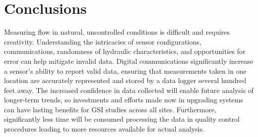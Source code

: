 \section{Conclusions}

Measuring flow in natural, uncontrolled conditions is difficult and requires creativity.
Understanding the intricacies of sensor configurations, communications, randomness of hydraulic characteristics, and opportunities for error can help mitigate invalid data.
Digital communications significantly increase a sensor's ability to report valid data, ensuring that measurements taken in one location are accurately represented and stored by a data logger several hundred feet away.
The increased confidence in data collected will enable future analysis of longer-term trends, so investments and efforts made now in upgrading systems can have lasting benefits for GSI studies across all sites.
Furthermore, significantly less time will be consumed processing the data in quality control procedures leading to more resources available for actual analysis.